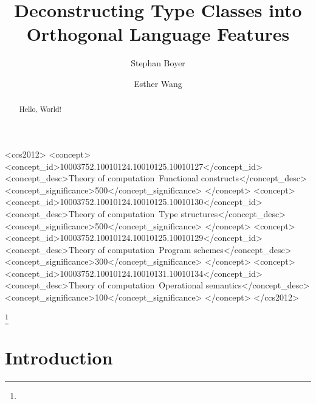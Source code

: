 \documentclass[acmlarge]{acmart}
\begin{document}
\title{Deconstructing Type Classes into Orthogonal Language Features}
\author{Stephan Boyer}
\author{Esther Wang}


\begin{abstract}
  Hello, World!
\end{abstract}


%
\begin{CCSXML}
<ccs2012>
<concept>
<concept_id>10003752.10010124.10010125.10010127</concept_id>
<concept_desc>Theory of computation~Functional constructs</concept_desc>
<concept_significance>500</concept_significance>
</concept>
<concept>
<concept_id>10003752.10010124.10010125.10010130</concept_id>
<concept_desc>Theory of computation~Type structures</concept_desc>
<concept_significance>500</concept_significance>
</concept>
<concept>
<concept_id>10003752.10010124.10010125.10010129</concept_id>
<concept_desc>Theory of computation~Program schemes</concept_desc>
<concept_significance>300</concept_significance>
</concept>
<concept>
<concept_id>10003752.10010124.10010131.10010134</concept_id>
<concept_desc>Theory of computation~Operational semantics</concept_desc>
<concept_significance>100</concept_significance>
</concept>
</ccs2012>
\end{CCSXML}


%
%

\terms{}



\thanks{
}


\maketitle



\section{Introduction}
\end{document}
